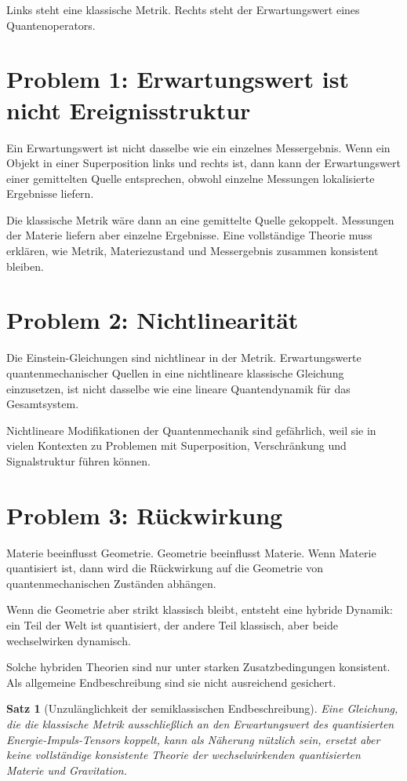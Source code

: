 \documentclass[11pt,a4paper,oneside]{book}
\theoremstyle{definition}
\theoremstyle{plain}
\newtheorem{satz}[definition]{Satz}
\theoremstyle{remark}
\begin{document}
Links steht eine klassische Metrik. Rechts steht der Erwartungswert eines Quantenoperators.

\section{Problem 1: Erwartungswert ist nicht Ereignisstruktur}
Ein Erwartungswert ist nicht dasselbe wie ein einzelnes Messergebnis. Wenn ein Objekt in einer Superposition links und rechts ist, dann kann der Erwartungswert einer gemittelten Quelle entsprechen, obwohl einzelne Messungen lokalisierte Ergebnisse liefern.

Die klassische Metrik wäre dann an eine gemittelte Quelle gekoppelt. Messungen der Materie liefern aber einzelne Ergebnisse. Eine vollständige Theorie muss erklären, wie Metrik, Materiezustand und Messergebnis zusammen konsistent bleiben.

\section{Problem 2: Nichtlinearität}
Die Einstein-Gleichungen sind nichtlinear in der Metrik. Erwartungswerte quantenmechanischer Quellen in eine nichtlineare klassische Gleichung einzusetzen, ist nicht dasselbe wie eine lineare Quantendynamik für das Gesamtsystem.

Nichtlineare Modifikationen der Quantenmechanik sind gefährlich, weil sie in vielen Kontexten zu Problemen mit Superposition, Verschränkung und Signalstruktur führen können.

\section{Problem 3: Rückwirkung}
Materie beeinflusst Geometrie. Geometrie beeinflusst Materie. Wenn Materie quantisiert ist, dann wird die Rückwirkung auf die Geometrie von quantenmechanischen Zuständen abhängen.

Wenn die Geometrie aber strikt klassisch bleibt, entsteht eine hybride Dynamik: ein Teil der Welt ist quantisiert, der andere Teil klassisch, aber beide wechselwirken dynamisch.

Solche hybriden Theorien sind nur unter starken Zusatzbedingungen konsistent. Als allgemeine Endbeschreibung sind sie nicht ausreichend gesichert.

\begin{satz}[Unzulänglichkeit der semiklassischen Endbeschreibung]
Eine Gleichung, die die klassische Metrik ausschließlich an den Erwartungswert des quantisierten Energie-Impuls-Tensors koppelt, kann als Näherung nützlich sein, ersetzt aber keine vollständige konsistente Theorie der wechselwirkenden quantisierten Materie und Gravitation.
\end{satz}
\end{document}
